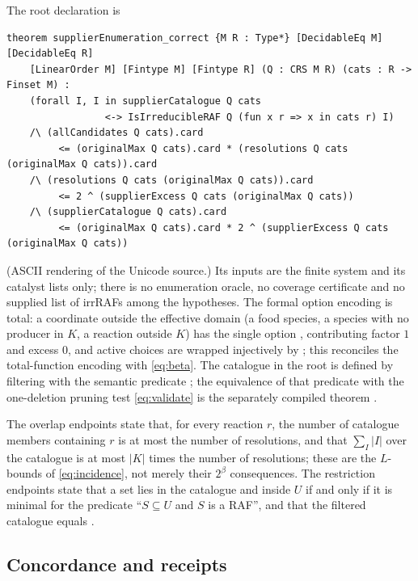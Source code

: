 \documentclass[11pt,a4paper]{article}
\theoremstyle{plain}
\theoremstyle{definition}
\theoremstyle{remark}
\begin{document}
The root declaration is
\begin{footnotesize}\begin{verbatim}
theorem supplierEnumeration_correct {M R : Type*} [DecidableEq M] [DecidableEq R]
    [LinearOrder M] [Fintype M] [Fintype R] (Q : CRS M R) (cats : R -> Finset M) :
    (forall I, I in supplierCatalogue Q cats
                 <-> IsIrreducibleRAF Q (fun x r => x in cats r) I)
    /\ (allCandidates Q cats).card
         <= (originalMax Q cats).card * (resolutions Q cats (originalMax Q cats)).card
    /\ (resolutions Q cats (originalMax Q cats)).card
         <= 2 ^ (supplierExcess Q cats (originalMax Q cats))
    /\ (supplierCatalogue Q cats).card
         <= (originalMax Q cats).card * 2 ^ (supplierExcess Q cats (originalMax Q cats))
\end{verbatim}\end{footnotesize}
(ASCII rendering of the Unicode source.) Its inputs are the finite system and its catalyst lists only; there is no enumeration oracle, no coverage certificate and no supplied list of irrRAFs among the hypotheses. The formal option encoding is total: a coordinate outside the effective domain (a food species, a species with no producer in $K$, a reaction outside $K$) has the single option , contributing factor $1$ and excess $0$, and active choices are wrapped injectively by ; this reconciles the total-function encoding with \eqref{eq:beta}. The catalogue in the root is defined by filtering  with the semantic predicate ; the equivalence of that predicate with the one-deletion pruning test \eqref{eq:validate} is the separately compiled theorem .

The overlap endpoints state that, for every reaction $r$, the number of catalogue members containing $r$ is at most the number of resolutions, and that $\sum_{I}|I|$ over the catalogue is at most $|K|$ times the number of resolutions; these are the $L$-bounds of \eqref{eq:incidence}, not merely their $2^\beta$ consequences. The restriction endpoints state that a set lies in the catalogue and inside $U$ if and only if it is minimal for the predicate ``$S\subseteq U$ and $S$ is a RAF'', and that the filtered catalogue equals .

\subsection{Concordance and receipts}
\end{document}
